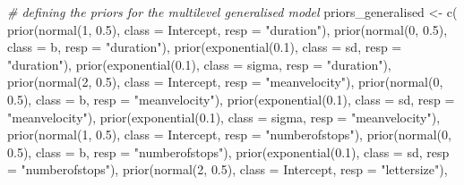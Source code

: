 \documentclass[
  11pt,
  english,
  ,doc,mask,floatsintext]{apa6}
\newenvironment{Shaded}{}{}
\newcommand{\AttributeTok}[1]{\textcolor[rgb]{0.49,0.56,0.16}{#1}}
\newcommand{\CommentTok}[1]{\textcolor[rgb]{0.38,0.63,0.69}{\textit{#1}}}
\newcommand{\DecValTok}[1]{\textcolor[rgb]{0.25,0.63,0.44}{#1}}
\newcommand{\FloatTok}[1]{\textcolor[rgb]{0.25,0.63,0.44}{#1}}
\newcommand{\FunctionTok}[1]{\textcolor[rgb]{0.02,0.16,0.49}{#1}}
\newcommand{\NormalTok}[1]{#1}
\newcommand{\OtherTok}[1]{\textcolor[rgb]{0.00,0.44,0.13}{#1}}
\newcommand{\StringTok}[1]{\textcolor[rgb]{0.25,0.44,0.63}{#1}}
\begin{document}
\begin{Shaded}
\begin{Highlighting}[]
\CommentTok{\# defining the priors for the multilevel generalised model}
\NormalTok{priors\_generalised }\OtherTok{\textless{}{-}} \FunctionTok{c}\NormalTok{(}
    \FunctionTok{prior}\NormalTok{(}\FunctionTok{normal}\NormalTok{(}\DecValTok{1}\NormalTok{, }\FloatTok{0.5}\NormalTok{), }\AttributeTok{class =}\NormalTok{ Intercept, }\AttributeTok{resp =} \StringTok{"duration"}\NormalTok{),}
    \FunctionTok{prior}\NormalTok{(}\FunctionTok{normal}\NormalTok{(}\DecValTok{0}\NormalTok{, }\FloatTok{0.5}\NormalTok{), }\AttributeTok{class =}\NormalTok{ b, }\AttributeTok{resp =} \StringTok{"duration"}\NormalTok{),}
    \FunctionTok{prior}\NormalTok{(}\FunctionTok{exponential}\NormalTok{(}\FloatTok{0.1}\NormalTok{), }\AttributeTok{class =}\NormalTok{ sd, }\AttributeTok{resp =} \StringTok{"duration"}\NormalTok{),}
    \FunctionTok{prior}\NormalTok{(}\FunctionTok{exponential}\NormalTok{(}\FloatTok{0.1}\NormalTok{), }\AttributeTok{class =}\NormalTok{ sigma, }\AttributeTok{resp =} \StringTok{"duration"}\NormalTok{),}
    \FunctionTok{prior}\NormalTok{(}\FunctionTok{normal}\NormalTok{(}\DecValTok{2}\NormalTok{, }\FloatTok{0.5}\NormalTok{), }\AttributeTok{class =}\NormalTok{ Intercept, }\AttributeTok{resp =} \StringTok{"meanvelocity"}\NormalTok{),}
    \FunctionTok{prior}\NormalTok{(}\FunctionTok{normal}\NormalTok{(}\DecValTok{0}\NormalTok{, }\FloatTok{0.5}\NormalTok{), }\AttributeTok{class =}\NormalTok{ b, }\AttributeTok{resp =} \StringTok{"meanvelocity"}\NormalTok{),}
    \FunctionTok{prior}\NormalTok{(}\FunctionTok{exponential}\NormalTok{(}\FloatTok{0.1}\NormalTok{), }\AttributeTok{class =}\NormalTok{ sd, }\AttributeTok{resp =} \StringTok{"meanvelocity"}\NormalTok{),}
    \FunctionTok{prior}\NormalTok{(}\FunctionTok{exponential}\NormalTok{(}\FloatTok{0.1}\NormalTok{), }\AttributeTok{class =}\NormalTok{ sigma, }\AttributeTok{resp =} \StringTok{"meanvelocity"}\NormalTok{),}
    \FunctionTok{prior}\NormalTok{(}\FunctionTok{normal}\NormalTok{(}\DecValTok{1}\NormalTok{, }\FloatTok{0.5}\NormalTok{), }\AttributeTok{class =}\NormalTok{ Intercept, }\AttributeTok{resp =} \StringTok{"numberofstops"}\NormalTok{),}
    \FunctionTok{prior}\NormalTok{(}\FunctionTok{normal}\NormalTok{(}\DecValTok{0}\NormalTok{, }\FloatTok{0.5}\NormalTok{), }\AttributeTok{class =}\NormalTok{ b, }\AttributeTok{resp =} \StringTok{"numberofstops"}\NormalTok{),}
    \FunctionTok{prior}\NormalTok{(}\FunctionTok{exponential}\NormalTok{(}\FloatTok{0.1}\NormalTok{), }\AttributeTok{class =}\NormalTok{ sd, }\AttributeTok{resp =} \StringTok{"numberofstops"}\NormalTok{),}
    \FunctionTok{prior}\NormalTok{(}\FunctionTok{normal}\NormalTok{(}\DecValTok{2}\NormalTok{, }\FloatTok{0.5}\NormalTok{), }\AttributeTok{class =}\NormalTok{ Intercept, }\AttributeTok{resp =} \StringTok{"lettersize"}\NormalTok{),}

\end{Highlighting}
\end{Shaded}
\end{document}

